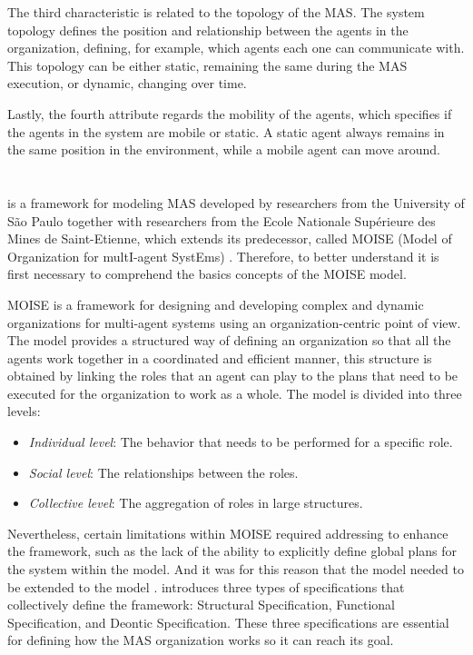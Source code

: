 The third characteristic is related to the topology of the MAS. The system topology defines the position and relationship between the agents in the organization, defining, for example, which agents each one can communicate with. This topology can be either static, remaining the same during the MAS execution, or dynamic, changing over time.

Lastly, the fourth attribute regards the mobility of the agents, which specifies if the agents in the system are mobile or static. A static agent always remains in the same position in the environment, while a mobile agent can move around.

\section[\MOISEp]{\MOISEpBf}

\MOISEp \cite{MOISEp} is a framework for modeling MAS developed by researchers from the University of São Paulo together with researchers from the Ecole Nationale Supérieure des Mines de Saint-Etienne, which extends its predecessor, called MOISE (Model of Organization for multI-agent SystEms) \cite{Moise}. Therefore, to better understand \MOISEp it is first necessary to comprehend the basics concepts of the MOISE model.

MOISE is a framework for designing and developing complex and dynamic organizations for multi-agent systems using an organization-centric point of view. The model provides a structured way of defining an organization so that all the agents work together in a coordinated and efficient manner, this structure is obtained by linking the roles that an agent can play to the plans that need to be executed for the organization to work as a whole. The model is divided into three levels:

\begin{itemize}
    \item \textit{Individual level}: The behavior that needs to be performed for a specific role.
    \item \textit{Social level}: The relationships between the roles.
    \item \textit{Collective level}: The aggregation of roles in large structures.
\end{itemize}

Nevertheless, certain limitations within MOISE required addressing to enhance the framework, such as the lack of the ability to explicitly define global plans for the system within the model. And it was for this reason that the model needed to be extended to the \MOISEp model \cite{MOISEp}. \MOISEp introduces three types of specifications that collectively define the framework: Structural Specification, Functional Specification, and Deontic Specification. These three specifications are essential for defining how the MAS organization works so it can reach its goal.

